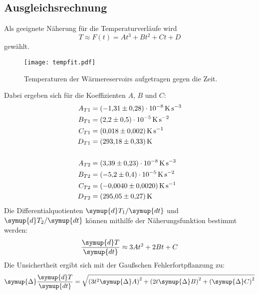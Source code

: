\subsection{Ausgleichsrechnung}
Als geeignete Näherung für die Temperaturverläufe wird
\begin{equation}
    T \approx F(t) = At^3 + Bt^2 + Ct + D
\end{equation}
gewählt.
\begin{figure}[H]
  \centering
  \texttt{[image: tempfit.pdf]}
  \caption{Temperaturen der Wärmereservoirs aufgetragen gegen die Zeit.}
  \label{fig:tempfit}
\end{figure}
\noindent Dabei ergeben sich für die Koeffizienten $A$, $B$ und $C$:
\begin{align*}
    A_{T1} & = \SI[per-mode=reciprocal]{-1.31 \pm 0.28e-8}{\kelvin\per\second\cubed}    \\
    B_{T1} & = \SI[per-mode=reciprocal]{2.2 \pm 0.5e-5}{\kelvin\per\second\squared}           \\
    C_{T1} & = \SI[per-mode=reciprocal]{0.018 \pm 0.002}{\kelvin\per\second}                       \\
    D_{T1} & = \SI[per-mode=reciprocal]{293.18 \pm 0.33}{\kelvin}                       \\
\\
    A_{T2} & = \SI[per-mode=reciprocal]{3.39 \pm 0.23e-8}{\kelvin\per\second\cubed}    \\
    B_{T2} & = \SI[per-mode=reciprocal]{-5.2 \pm 0.4e-5}{\kelvin\per\second\squared}           \\
    C_{T2} & = \SI[per-mode=reciprocal]{-0.0040 \pm 0.0020}{\kelvin\per\second}                       \\
    D_{T2} & = \SI[per-mode=reciprocal]{295.05 \pm 0.27}{\kelvin}                       \\
\end{align*}
Die Differentialquotienten $\symup{d}T_1/\symup{dt}$ und $\symup{d}T_2/\symup{dt}$ können mithilfe der Näherungsfunktion
bestimmt werden:
\begin{equation}
    \frac{\symup{d}T}{\symup{dt}} \approx 3At^2 + 2Bt + C
\end{equation}
Die Unsichertheit ergibt sich mit der Gaußschen Fehlerfortpflanzung zu:
\begin{equation}
    \symup{\Delta}\frac{\symup{d}T}{\symup{dt}} = \sqrt{\left(3t^2\symup{\Delta}A\right)^2+\left(2t\symup{\Delta}B\right)^2+\left(\symup{\Delta}C\right)^2}
\end{equation}
